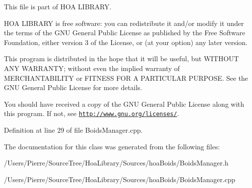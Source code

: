 This file is part of H\-O\-A L\-I\-B\-R\-A\-R\-Y.

H\-O\-A L\-I\-B\-R\-A\-R\-Y is free software\-: you can redistribute it and/or modify it under the terms of the G\-N\-U General Public License as published by the Free Software Foundation, either version 3 of the License, or (at your option) any later version.

This program is distributed in the hope that it will be useful, but W\-I\-T\-H\-O\-U\-T A\-N\-Y W\-A\-R\-R\-A\-N\-T\-Y; without even the implied warranty of M\-E\-R\-C\-H\-A\-N\-T\-A\-B\-I\-L\-I\-T\-Y or F\-I\-T\-N\-E\-S\-S F\-O\-R A P\-A\-R\-T\-I\-C\-U\-L\-A\-R P\-U\-R\-P\-O\-S\-E. See the G\-N\-U General Public License for more details.

You should have received a copy of the G\-N\-U General Public License along with this program. If not, see \href{http://www.gnu.org/licenses/}{\tt http\-://www.\-gnu.\-org/licenses/}. 

Definition at line 29 of file Boids\-Manager.\-cpp.



The documentation for this class was generated from the following files\-:\begin{DoxyCompactItemize}
\item 
/\-Users/\-Pierre/\-Source\-Tree/\-Hoa\-Library/\-Sources/hoa\-Boids/Boids\-Manager.\-h\item 
/\-Users/\-Pierre/\-Source\-Tree/\-Hoa\-Library/\-Sources/hoa\-Boids/Boids\-Manager.\-cpp\end{DoxyCompactItemize}
